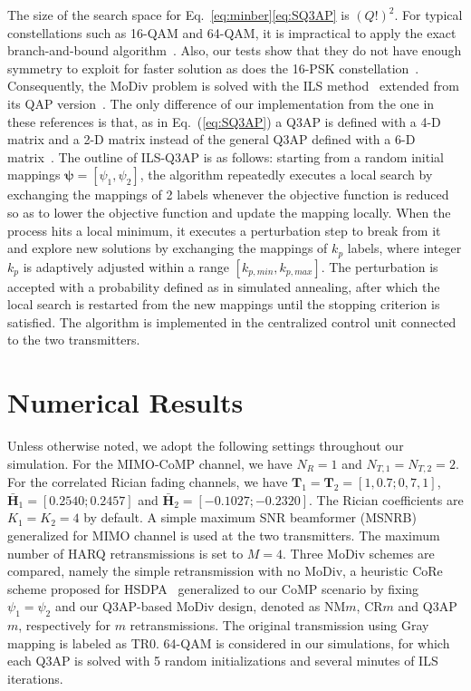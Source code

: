 \documentclass[journal]{IEEEtran}
\begin{document}
The size of the search space for Eq.~\eqref{eq:minber}\eqref{eq:SQ3AP} is
$(Q!)^2$.
For typical constellations such as 16-QAM and
64-QAM, it is impractical to apply the exact branch-and-bound algorithm~\cite{hahn2008quadratic}. Also, our tests show that they do not have
enough symmetry to exploit for faster solution as does the 16-PSK
constellation~\cite{mittelmann2015solving}.
Consequently, the MoDiv problem is solved with the ILS
method~\cite[Sec. 5.5]{hahn2008quadratic} extended from its QAP
version~\cite{stutzle2006iterated}. The only difference of our
implementation from the one in these references is that, as in
Eq.~(\ref{eq:SQ3AP}) a Q3AP is defined with a 4-D matrix and a 2-D matrix
instead of the general Q3AP defined with a 6-D
matrix~\cite[Eq.(2)]{hahn2008quadratic}. The outline of ILS-Q3AP is as
follows: starting from a random initial mappings $\bm{\psi}=[\psi_1,
\psi_2]$, the algorithm repeatedly executes a local search by exchanging the
mappings of 2 labels whenever the objective function is reduced so as to lower
the objective function and update the mapping locally. When the process hits a
local minimum, it executes a perturbation step to break from it and explore new
solutions by exchanging the mappings of $k_p$ labels, where integer $k_p$ is
adaptively adjusted within a range $[k_{p,min}, k_{p,max}]$. The perturbation is
accepted with a probability defined as in simulated annealing, after which the
local search is restarted from the new mappings until the stopping criterion is
satisfied. The algorithm is implemented in the centralized control
unit connected to the two transmitters.

\section{Numerical Results}
\label{sec:numerical}
Unless otherwise noted, we adopt the following
settings throughout our simulation. For the MIMO-CoMP channel, we have $N_R=1$
and $N_{T, 1} = N_{T, 2} = 2$. For the correlated Rician fading channels, we
have $\mathbf{T}_1 =
\mathbf{T}_2 =[1,0.7;0,7,1]$, $\bar{\mathbf{H}}_{1} = [0.2540;
0.2457]$ and $\bar{\mathbf{H}}_{2} = [-0.1027; -0.2320]$.
The Rician coefficients are $K_1 = K_2 = 4$ by default. A simple maximum SNR
beamformer (MSNRB)~\cite{barriac2006space} generalized for MIMO channel is used at the two transmitters. 
The maximum number of HARQ retransmissions is set
to $M=4$. Three MoDiv schemes are compared, namely the simple retransmission with
no MoDiv, a heuristic CoRe scheme proposed for
HSDPA~\cite{panasonic2001enhanced} generalized to our CoMP scenario by fixing
$\psi_1 = \psi_2$ and our Q3AP-based MoDiv design, denoted
as NM$m$, CR$m$ and Q3AP$m$, respectively for $m$ retransmissions. The original
transmission using Gray mapping is labeled as TR0. 64-QAM is considered in our
simulations, for which each Q3AP is solved with 5 random initializations and
several minutes of ILS iterations.
\end{document}
